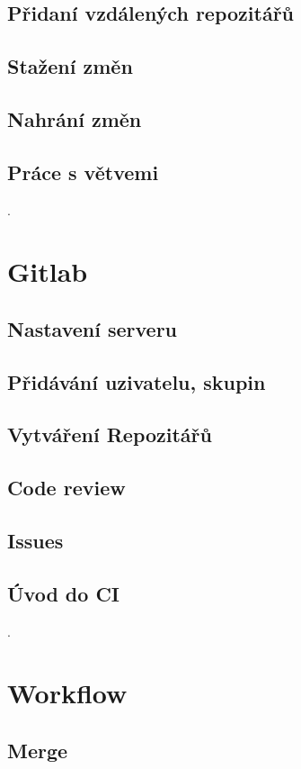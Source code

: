 \documentclass[11pt]{article}
\begin{document}
\subsection{Přidaní vzdálených repozitářů}
\subsection{Stažení změn}
\subsection{Nahrání změn}
\subsection{Práce s větvemi}

.

\section{Gitlab}
\subsection{Nastavení serveru}
\subsection{Přidávání uzivatelu, skupin}
\subsection{Vytváření Repozitářů}
\subsection{Code review}
\subsection{Issues}
\subsection{Úvod do CI}

.

\section{Workflow}
\subsection{Merge}
\end{document}
